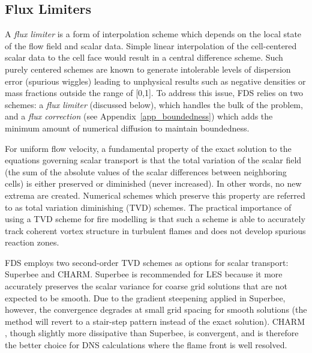 \subsection{Flux Limiters}
\label{sec_flux_limiters}

A \emph{flux limiter} is a form of interpolation scheme which depends on the local state of the flow field and scalar data. Simple linear interpolation of the cell-centered scalar data to the cell face would result in a central difference scheme.  Such purely centered schemes are known to generate intolerable levels of dispersion error (spurious wiggles) leading to unphysical results such as negative densities or mass fractions outside the range of [0,1].  To address this issue, FDS relies on two schemes: a \emph{flux limiter} (discussed below), which handles the bulk of the problem, and a \emph{flux correction} (see Appendix~\ref{app_boundedness}) which adds the minimum amount of numerical diffusion to maintain boundedness.

For uniform flow velocity, a fundamental property of the exact solution to the equations governing scalar transport is that the total variation of the scalar field (the sum of the absolute values of the scalar differences between neighboring cells) is either preserved or diminished (never increased).  In other words, no new extrema are created.  Numerical schemes which preserve this property are referred to as total variation diminishing (TVD) schemes.  The practical importance of using a TVD scheme for fire modelling is that such a scheme is able to accurately track coherent vortex structure in turbulent flames and does not develop spurious reaction zones.

FDS employs two second-order TVD schemes as options for scalar transport: Superbee and CHARM.  Superbee \cite{Roe:1986} is recommended for LES because it more accurately preserves the scalar variance for coarse grid solutions that are not expected to be smooth.  Due to the gradient steepening applied in Superbee, however, the convergence degrades at small grid spacing for smooth solutions (the method will revert to a stair-step pattern instead of the exact solution).  CHARM \cite{Zhou:1995}, though slightly more dissipative than Superbee, is convergent, and is therefore the better choice for DNS calculations where the flame front is well resolved.

